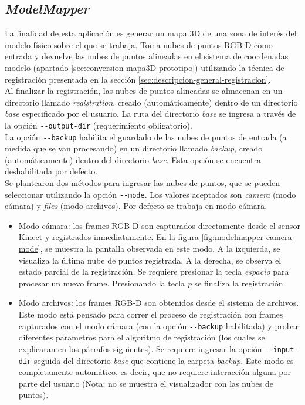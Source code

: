 \subsection{\textit{ModelMapper}}
\label{sec:model-mapper}
La finalidad de esta aplicación es generar un mapa 3D de una zona de interés del modelo físico sobre el que se trabaja. Toma nubes de puntos RGB-D como entrada y devuelve las nubes de puntos alineadas en el sistema de coordenadas modelo (apartado \ref{sec:conversion-mapa3D-prototipo}) utilizando la técnica de registración presentada en la sección \ref{sec:descripcion-general-registracion}. \\
Al finalizar la registración, las nubes de puntos alineadas se almacenan en un directorio llamado \textit{registration}, creado (automáticamente) dentro de un directorio \textit{base} especificado por el usuario. La ruta del directorio \textit{base} se ingresa a través de la opción \verb|--output-dir| (requerimiento obligatorio). \\
La opción \verb|--backup| habilita el guardado de las nubes de puntos de entrada (a medida que se van procesando) en un directorio llamado \textit{backup}, creado (automáticamente) dentro del directorio \textit{base}. Esta opción se encuentra deshabilitada por defecto.\\
Se plantearon dos métodos para ingresar las nubes de puntos, que se pueden seleccionar utilizando la opción \verb|--mode|.
Los valores aceptados son \textsl{camera} (modo cámara) y \textsl{files} (modo archivos). Por defecto se trabaja en modo cámara.
\begin{itemize}

\item Modo cámara: los frames RGB-D son capturados directamente desde el sensor Kinect y registrados inmediatamente. En la figura \ref{fig:modelmapper-camera-mode}, se muestra la pantalla observada en este modo. A la izquierda, se visualiza la última nube de puntos registrada. A la derecha, se observa el estado parcial de la registración. Se requiere presionar la tecla \textit{espacio} para procesar un nuevo frame. Presionando la tecla \textit{p} se finaliza la registración.

\item Modo archivos: los frames RGB-D son obtenidos desde el sistema de archivos. Este modo está pensado para correr el proceso de registración con frames capturados con el modo cámara (con la opción \verb|--backup| habilitada) y probar diferentes parametros para el algoritmo de registración (los cuales se explicaran en los párrafos siguientes). Se requiere ingresar la opción \verb|--input-dir| seguida del directorio \textit{base} que contiene la carpeta \textit{backup}. Este modo es completamente automático, es decir, que no requiere interacción alguna por parte del usuario (Nota: no se muestra el visualizador con las nubes de puntos).

\end{itemize}

